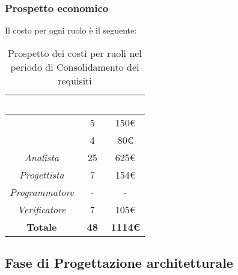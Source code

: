 \subsubsection{Prospetto economico}
Il costo per ogni ruolo è il seguente:
\begin{table}[H]
	\begin{center}
		\begin{tabular}{ c c c }
		\rowcolor{darkblue} 
		\textcolor{white}{\textbf{Ruolo}} & \textcolor{white}{\textbf{Ore}} & \textcolor{white}{\textbf{Costo}} \\ \hline
		\textit{\Responsabile} & 5 & 150€ \\ \hline
		\textit{\Amministratore} & 4 & 80€ \\ \hline
		\textit{Analista} & 25 & 625€ \\ \hline
		\textit{Progettista} & 7 & 154€ \\ \hline
		\textit{Programmatore}  & - & - \\ \hline
		\textit{Verificatore} & 7 & 105€ \\ \hline
		\textbf{Totale} & \textbf{48} & \textbf{1114€} \\ \hline
		\end{tabular}
	\caption{ Prospetto dei costi per ruoli nel periodo di Consolidamento dei requisiti}
	\end{center}
\end{table}

\subsection{Fase di Progettazione architetturale}
